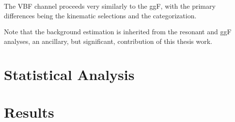 The VBF channel proceeds very similarly to the ggF, with the primary differences being the 
kinematic selections and the categorization.


Note that the background estimation is inherited from the resonant and ggF analyses, 
an ancillary, but significant, contribution of this thesis work.

\section{Statistical Analysis}

\section{Results}
